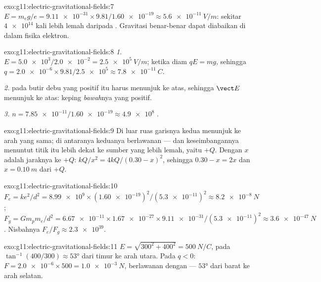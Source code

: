 \begin{solution}{exo:g11:electric-gravitational-fields:7}
$E = m_e g / e = \num{9.11e-31} \times 9.81 / \num{1.60e-19}
\approx \qty{5.6e-11}{V/m}$: sekitar $\num{4e14}$ kali lebih lemah
daripada  . Gravitasi benar-benar dapat diabaikan di
dalam fisika elektron.
\end{solution}

\begin{solution}{exo:g11:electric-gravitational-fields:8}
\emph{1.} $E = \num{5.0e3} / \num{2.0e-2} = \qty{2.5e5}{V/m}$; ketika
diam $qE = mg$, sehingga
$q = \num{2.0e-6} \times 9.81 / \num{2.5e5} \approx \qty{7.8e-11}{C}$.

\emph{2.}  pada butir debu yang positif itu harus menunjuk ke atas,
sehingga $\vect E$ menunjuk ke atas: keping \emph{bawah}nya yang
positif.

\emph{3.} $n = \num{7.85e-11} / \num{1.60e-19} \approx \num{4.9e8}$
.
\end{solution}

\begin{solution}{exo:g11:electric-gravitational-fields:9}
Di luar ruas garisnya kedua  menunjuk ke arah yang sama; di
antaranya keduanya berlawanan --- dan keseimbangannya menuntut titik
itu lebih dekat ke sumber yang lebih lemah, yaitu $+Q$. Dengan $x$
adalah jaraknya ke $+Q$: $kQ/x^2 = 4kQ/(0.30 - x)^2$, sehingga
$0.30 - x = 2x$ dan $x = \qty{0.10}{m}$ dari $+Q$.
\end{solution}

\begin{solution}{exo:g11:electric-gravitational-fields:10}
$F_e = ke^2/d^2 = \num{8.99e9} \times (\num{1.60e-19})^2 /
(\num{5.3e-11})^2 \approx \qty{8.2e-8}{N}$;
$F_g = G m_p m_e / d^2 = \num{6.67e-11} \times \num{1.67e-27} \times
\num{9.11e-31} / (\num{5.3e-11})^2 \approx \qty{3.6e-47}{N}$. Nisbahnya
$F_e / F_g \approx \num{2.3e39}$.
\end{solution}

\begin{solution}{exo:g11:electric-gravitational-fields:11}
$E = \sqrt{300^2 + 400^2} = \qty{500}{N/C}$, pada
$\tan^{-1}(400/300) \approx \ang{53}$ dari timur ke arah utara. Pada
$q < 0$: $F = \num{2.0e-6} \times 500 = \qty{1.0e-3}{N}$, berlawanan
dengan  --- $\ang{53}$ dari barat ke arah selatan.
\end{solution}

